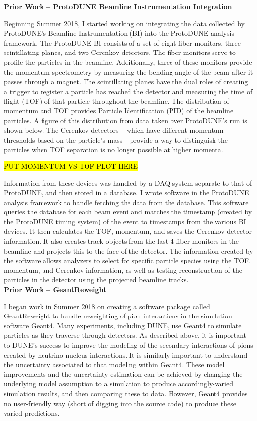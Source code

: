 \documentclass[12pt]{article}
\begin{document}
\textbf{Prior Work – ProtoDUNE Beamline Instrumentation Integration}

	Beginning Summer 2018, I started working on integrating the data collected by ProtoDUNE’s Beamline Instrumentation (BI) into the ProtoDUNE analysis framework. The ProtoDUNE BI consists of a set of eight fiber monitors, three scintillating planes, and two Cerenkov detectors. The fiber monitors serve to profile the particles in the beamline. Additionally, three of these monitors provide the momentum spectrometry by measuring the bending angle of the beam after it passes through a magnet. The scintillating planes have the dual roles of creating a trigger to register a particle has reached the detector and measuring the time of flight (TOF) of that particle throughout the beamline. The distribution of momentum and TOF provides Particle Identification (PID) of the beamline particles. A figure of this distribution from data taken over ProtoDUNE’s run is shown below. The Cerenkov detectors – which have different momentum thresholds based on the particle’s mass  – provide a way to distinguish the particles when TOF separation is no longer possible at higher momenta.

\hl{PUT MOMENTUM VS TOF PLOT HERE}

	Information from these devices was handled by a DAQ system separate to that of ProtoDUNE, and then stored in a database. I wrote software in the ProtoDUNE analysis framework to handle fetching the data from the database. This software queries the database for each beam event and matches the timestamp (created by the ProtoDUNE timing system) of the event to timestamps from the various BI devices. It then calculates the TOF, momentum, and saves the Cerenkov detector information. It also creates track objects from the last 4 fiber monitors in the beamline and projects this to the face of the detector. The information created by the software allows analyzers to select for specific particle species using the TOF, momentum, and Cerenkov information, as well as testing reconstruction of the particles in the detector using the projected beamline tracks. 
\\

\textbf{Prior Work – GeantReweight}

	I began work in Summer 2018 on creating a software package called GeantReweight to handle reweighting of pion interactions in the simulation software Geant4. Many experiments, including DUNE, use Geant4 to simulate particles as they traverse through detectors. As described above, it is important to DUNE’s success to improve the modeling of the secondary interactions of pions created by neutrino-nucleus interactions. It is similarly important to understand the uncertainty associated to that modeling within Geant4. These model improvements and the uncertainty estimation can be achieved by changing the underlying model assumption to a simulation to produce accordingly-varied simulation results, and then comparing these to data. However, Geant4 provides no user-friendly way (short of digging into the source code) to produce these varied predictions. 
	
\end{document}
